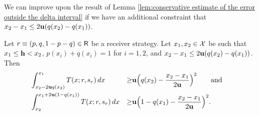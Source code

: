 We can improve upon the result of Lemma \ref{lem:conservative estimate of the error outside the delta interval} if we have an additional constraint that $x_2 - x_1 \leq 2\mathbf{u}(q(x_2) - q(x_1))$.
\begin{lem}\label{lem:more sharp estimate of the error outside the delta interval}
    Let $r \equiv (p, q, 1 - p - q) \in \mathsf{R}$ be a receiver strategy. Let $x_1, x_2 \in \mathcal{X}$ be such that $x_1 \leq \mathbf{h} < x_2$, $p(x_i) + q(x_i) = 1$ for $i = 1, 2$, and $x_2 - x_1 \leq 2\mathbf{u}(q(x_2) - q(x_1))$. Then
    \begin{equation*}
    \begin{aligned}
        &\int_{x_2 - 2\mathbf{u} q(x_2)}^{x_1} T(x; r, s_r) \, dx &\geq& \mathbf{u} \Big( q(x_2) - \frac{x_2 - x_1}{2\mathbf{u}} \Big)^2 \quad \hbox{\quad and\quad} \\
        &\int_{x_2}^{x_1 + 2\mathbf{u}(1 - q(x_1))} T(x; r, s_r) \, dx &\geq& \mathbf{u} \Big( 1 - q(x_1) - \frac{x_2 - x_1}{2\mathbf{u}} \Big)^2.
    \end{aligned}
    \end{equation*}
\end{lem}

